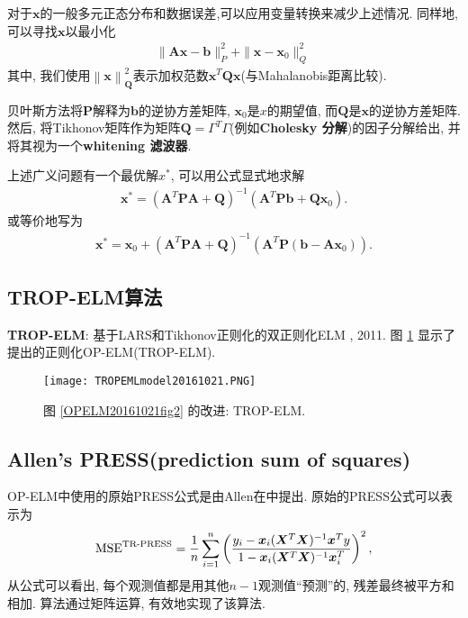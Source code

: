 对于$\bm x$的一般多元正态分布和数据误差,可以应用变量转换来减少上述情况. 同样地, 可以寻找$\bm x$以最小化
\begin{align}
    \|\bm A\bm x-\bm b\|_{P}^{2}+\|\bm x-\bm x_{0}\|_{Q}^{2}\,
\end{align}
其中, 我们使用$\left\|\bm x\right\|_{\bm Q}^{2}$表示加权范数$\bm x^{T}\bm Q\bm x$(与Mahalanobis距离比较).

\begin{remark}
贝叶斯方法将$\bm P$解释为$\bm b$的逆协方差矩阵, $\bm x_0$是$x$的期望值, 而$\bm Q$是$\bm x$的逆协方差矩阵.
然后, 将Tikhonov矩阵作为矩阵$\displaystyle\bm Q=\Gamma^{T}\Gamma$(例如\textbf{Cholesky 分解})的因子分解给出, 并将其视为一个\textbf{whitening 滤波器}.
\end{remark}

上述广义问题有一个最优解$x^{*}$, 可以用公式显式地求解
\begin{align}
    \bm x^{*}=(\bm A^{T}\bm P\bm A+\bm Q)^{-1}(\bm A^{T}\bm P\bm b+\bm Q\bm x_{0}).
\end{align}
或等价地写为
\begin{align}
    \bm x^{*}=\bm x_{0}+(\bm A^{T}\bm P\bm A+\bm Q)^{-1}(\bm A^{T}\bm P(\bm b-\bm A \bm x_{0})).
\end{align}
\subsection{TROP-ELM算法}
\textbf{TROP-ELM}: 基于LARS和Tikhonov正则化的双正则化ELM \cite{MichevanHeeswijk2011-30641}, 2011.
图 \ref{TROPEMLmodel20161021fig2} 显示了提出的正则化OP-ELM(TROP-ELM).
\begin{figure}[H]
    \begin{center}
    \texttt{[image: TROPEMLmodel20161021.PNG]}
    \end{center}
    \caption{图 \ref{OPELM20161021fig2} 的改进: TROP-ELM.}
    \label{TROPEMLmodel20161021fig2}
\end{figure}
\subsection{Allen's PRESS(prediction sum of squares)}
OP-ELM中使用的原始PRESS公式是由Allen在\cite{MADavid1972}中提出. 原始的PRESS公式可以表示为
\begin{align}\label{AIC5eqn519}
  \textup{MSE}^{\textup{TR-PRESS}}=\frac 1 n \sum_{i=1}^n \left( \frac{y_i-\bm x_i(\bm X^T \bm X)^{-1}\bm x^T y}
       {1-\bm x_i(\bm X^T \bm X)^{-1}\bm x_i^T}\right)^2,
\end{align}
从公式可以看出, 每个观测值都是用其他$n-1$观测值“预测”的, 残差最终被平方和相加. 算法通过矩阵运算, 有效地实现了该算法.

